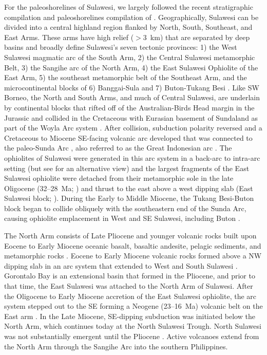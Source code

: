 \documentclass[11pt,letterpaper]{article}
\begin{document}
For the paleoshorelines of Sulawesi, we largely followed the recent stratigraphic compilation and paleoshorelines compilation of \citet{Nugraha2018a}. Geographically, Sulawesi can be divided into a central highland region flanked by North, South, Southeast, and East Arms. These arms have high relief ($>$3~km) that are separated by deep basins and broadly define Sulawesi's seven tectonic provinces: 1) the West Sulawesi magmatic arc of the South Arm, 2) the Central Sulawesi metamorphic Belt, 3) the Sangihe arc of the North Arm, 4) the East Sulawesi Ophiolite of the East Arm, 5) the southeast metamorphic belt of the Southeast Arm, and the microcontinental blocks of 6) Banggai-Sula and 7) Buton-Tukang Besi \citep{Hamilton1979a, Katili1978a}. Like SW Borneo, the North and South Arms, and much of Central Sulawesi, are underlain by continental blocks that rifted off of the Australian-Birds Head margin in the Jurassic and collided in the Cretaceous with Eurasian basement of Sundaland as part of the Woyla Arc system \citep{Parkinson1998b, Hennig2016a, Hall2017a, Hennig2017a}. After collision, subduction polarity reversed and a Cretaceous to Miocene SE-facing volcanic arc developed \citep{Polve1997a, Elburg1998a} that was connected to the paleo-Sunda Arc \citep{Hall2002b}, also referred to as the Great Indonesian arc \citep{Harris2006a}.  The ophiolites of Sulawesi were generated in this arc system in a back-arc to intra-arc setting \citep{Monnier1995a} (but see \citealp{Kadarusman2004a} for an alternative view) and the largest fragments of the East Sulawesi ophiolite were detached from their metamorphic sole in the late Oligocene (32--28~Ma; \citealp{Parkinson1998a}) and thrust to the east above a west dipping slab (East Sulawesi block; \citealp{Villeneuve2001a}). During the Early to Middle Miocene, the Tukang Besi-Buton block began to collide obliquely with the southeastern end of the Sunda Arc, causing ophiolite emplacement in West and SE Sulawesi, including Buton \citep{Smith1991a, Bergman1996a}.

The North Arm consists of Late Pliocene and younger volcanic rocks built upon Eocene to Early Miocene oceanic basalt, basaltic andesite, pelagic sediments, and metamorphic rocks \citep{Elburg1998a}. Eocene to Early Miocene volcanic rocks formed above a NW dipping slab in an arc system that extended to West and South Sulawesi \citep{vanLeeuwen2005a}. Gorontalo Bay is an extensional basin that formed in the Pliocene, and prior to that time, the East Sulawesi was attached to the North Arm of Sulawesi. After the Oligocene to Early Miocene accretion of the East Sulawesi ophiolite, the arc system stepped out to the SE forming a Neogene (23--16~Ma) volcanic belt on the East arm \citep{Kadarusman2004a}. In the Late Miocene, SE-dipping subduction was initiated below the North Arm, which continues today at the North Sulawesi Trough. North Sulawesi was not substantially emergent until the Pliocene \citep{vanLeeuwen2005a}. Active volcanoes extend from the North Arm through the Sangihe Arc into the southern Philippines.
\end{document}
